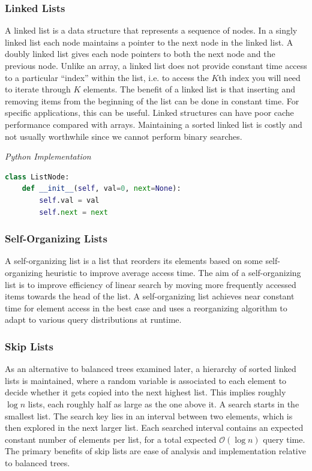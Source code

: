 \documentclass{article}
\newcommand{\bigO}{\mathcal{O}}
\begin{document}
    
    \subsubsection{Linked Lists}
    A linked list is a data structure that represents a sequence of nodes. In a singly linked list each node maintains a pointer to the next node in the linked list. A doubly linked list gives each node pointers to both the next node and the previous node. Unlike an array, a linked list does not provide constant time access to a particular ``index'' within the list, i.e. to access the $K$th index you will need to iterate through $K$ elements. The benefit of a linked list is that inserting and removing items from the beginning of the list can be done in constant time. For specific applications, this can be useful. Linked structures can have poor cache performance compared with arrays. Maintaining a sorted linked list is costly and not usually worthwhile since we cannot perform binary searches.

    
\vspace{8pt} \emph{Python Implementation}
\begin{lstlisting}[language=Python]
class ListNode:
    def __init__(self, val=0, next=None):
        self.val = val
        self.next = next
\end{lstlisting}
        
    \subsubsection{Self-Organizing Lists}
    A self-organizing list is a list that reorders its elements based on some self-organizing heuristic to improve average access time. The aim of a self-organizing list is to improve efficiency of linear search by moving more frequently accessed items towards the head of the list. A self-organizing list achieves near constant time for element access in the best case and uses a reorganizing algorithm to adapt to various query distributions at runtime.
    
    \subsubsection{Skip Lists}
    As an alternative to balanced trees examined later, a hierarchy of sorted linked lists is maintained, where a random variable is associated to each element to decide whether it gets copied into the next highest list. This implies roughly $\log n$ lists, each roughly half as large as the one above it. A search starts in the smallest list. The search key lies in an interval between two elements, which is then explored in the next larger list. Each searched interval contains an expected constant number of elements per list, for a total expected $\bigO(\log n)$ query time. The primary benefits of skip lists are ease of analysis and implementation relative to balanced trees.
    
\end{document}
